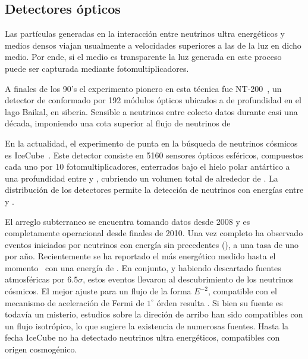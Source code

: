 	\subsection{Detectores \'opticos}
	Las part\'iculas generadas en la interacci\'on entre neutrinos ultra energ\'eticos y medios densos viajan usualmente a velocidades superiores a las de la luz en dicho medio.
	Por ende, si el medio es transparente la luz \cher{} generada en este proceso puede ser capturada mediante fotomultiplicadores.
	
	A finales de los 90's el experimento pionero en esta t\'ecnica fue NT-200~\cite{cite:nt200}, un detector de conformado por 192 m\'odulos \'opticos ubicados a  de profundidad en el lago Baikal, en siberia.
	Sensible a neutrinos entre  colecto datos durante casi una d\'ecada, imponiendo una cota superior al flujo de neutrinos de 
	
	En la actualidad, el experimento de punta en la b\'usqueda de neutrinos c\'osmicos es IceCube~\cite{cite:IceCube1}.
	Este detector consiste en 5160 sensores \'opticos esf\'ericos, compuestos cada uno por 10 fotomultiplicadores, enterrados bajo el hielo polar ant\'artico a una profundidad entre  y , cubriendo un volumen total de alrededor de .
	La distribuci\'on de los detectores permite la detecci\'on de neutrinos con energ\'ias entre  y .
	
	El arreglo subterraneo se encuentra tomando datos desde 2008 y es completamente operacional desde finales de 2010. 
	Una vez completo ha observado eventos iniciados por neutrinos con energ\'ia sin precedentes (), a una tasa de uno por a\~no.
	Recientemente se ha reportado el m\'as energ\'etico medido hasta el momento~\cite{cite:iceCubeEvent} con una energ\'ia de .
	En conjunto, y habiendo descartado fuentes atmosf\'ericas por $6.5\sigma$, estos eventos llevaron al descubrimiento de los neutrinos c\'osmicos.
	El mejor ajuste para un flujo de la forma $E^{-2}$, compatible con el mecanismo de aceleraci\'on de Fermi de $1^\circ$ \'orden resulta \cite{cite:multimess}.
	Si bien su fuente es todav\'ia un misterio, estudios sobre la direci\'on de arribo han sido compatibles con un flujo isotr\'opico, lo que sugiere la existencia de numerosas fuentes.
	Hasta la fecha IceCube no ha detectado neutrinos ultra energ\'eticos, compatibles con origen cosmog\'enico.
	
